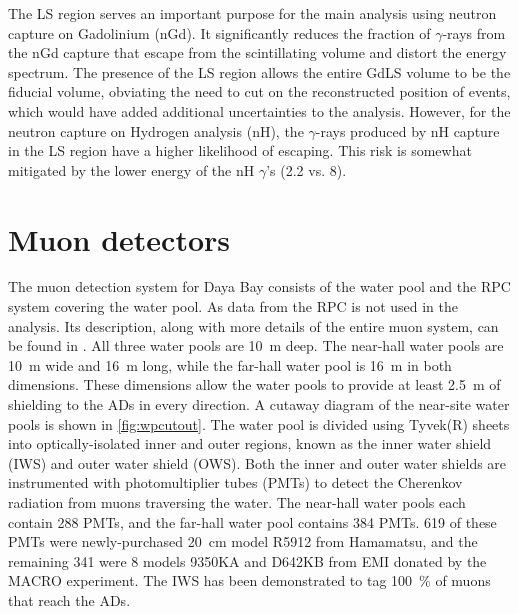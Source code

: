 \begin{figure}
    \label{fig:ibd_cartoon}
\end{figure}

The LS region serves an important purpose for the main \thetaot
analysis using neutron capture on Gadolinium (nGd).
It significantly reduces the fraction of $\gamma$-rays from the nGd capture
that escape from the scintillating volume and distort the energy spectrum.
The presence of the LS region allows the entire GdLS volume to be
the fiducial volume, obviating the need to cut on the reconstructed position
of events, which would have added additional uncertainties to the analysis.
However, for the neutron capture on Hydrogen analysis (nH),
the $\gamma$-rays produced by nH capture in the LS region
have a higher likelihood of escaping.
This risk is somewhat mitigated by the lower energy of the nH $\gamma$'s
(\SI{2.2}{\mev} vs. \SI{8}{\mev}).


\section{Muon detectors}

The muon detection system for Daya Bay consists of
the water pool and the RPC system covering the water pool.
As data from the RPC is not used in the \thetaot{} analysis.
Its description, along with more details of the entire muon system,
can be found in \cite{muonsystem2015}.
All three water pools are \SI{10}{\m} deep.
The near-hall water pools are \SI{10}{\m} wide and \SI{16}{\m} long,
while the far-hall water pool is \SI{16}{\m} in both dimensions.
These dimensions allow the water pools to provide at least \SI{2.5}{\m} of shielding
to the ADs in every direction.
A cutaway diagram of the near-site water pools is shown in \cref{fig:wpcutout}.
The water pool is divided using Tyvek(R) sheets
into optically-isolated inner and outer regions,
known as the inner water shield (IWS) and outer water shield (OWS).
Both the inner and outer water shields are instrumented with photomultiplier tubes (PMTs)
to detect the Cherenkov radiation from muons traversing the water.
The near-hall water pools each contain \num{288} PMTs,
and the far-hall water pool contains \num{384} PMTs.
\num{619} of these PMTs were newly-purchased \SI{20}{\cm}
model R5912 from Hamamatsu,
and the remaining \num{341} were \SI{8}{\inch} models 9350KA
and D642KB from EMI
donated by the MACRO experiment.
The IWS has been demonstrated to tag \SI{100}{\percent} of muons
that reach the ADs.


